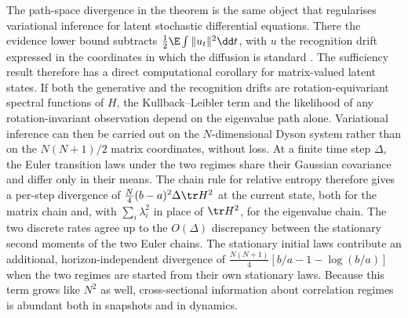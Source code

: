 The path-space divergence in the theorem is the same object that regularises variational inference for latent stochastic differential equations. There the evidence lower bound subtracts $\tfrac12\E\int\|u_t\|^2\dd t$, with $u$ the recognition drift expressed in the coordinates in which the diffusion is standard \citep{li2020scalable,rice2026sldi}. The sufficiency result therefore has a direct computational corollary for matrix-valued latent states. If both the generative and the recognition drifts are rotation-equivariant spectral functions of $H$, the Kullback--Leibler term and the likelihood of any rotation-invariant observation depend on the eigenvalue path alone. Variational inference can then be carried out on the $N$-dimensional Dyson system rather than on the $N(N+1)/2$ matrix coordinates, without loss. At a finite time step $\Delta$, the Euler transition laws under the two regimes share their Gaussian covariance and differ only in their means. The chain rule for relative entropy therefore gives a per-step divergence of $\tfrac N4(b-a)^2\Delta\tr H^2$ at the current state, both for the matrix chain and, with $\sum_i\lambda_i^2$ in place of $\tr H^2$, for the eigenvalue chain. The two discrete rates agree up to the $O(\Delta)$ discrepancy between the stationary second moments of the two Euler chains. The stationary initial laws contribute an additional, horizon-independent divergence of $\tfrac{N(N+1)}4[b/a-1-\log(b/a)]$ when the two regimes are started from their own stationary laws. Because this term grows like $N^2$ as well, cross-sectional information about correlation regimes is abundant both in snapshots and in dynamics.
